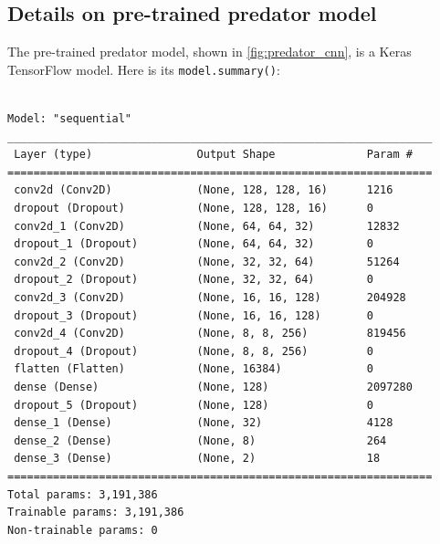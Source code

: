 \documentclass[acmtog]{acmart}
\begin{document}
\subsection{Details on pre-trained predator model}
The pre-trained predator model, shown in \ref{fig:predator_cnn}, is a Keras TensorFlow model. Here is its \texttt{model.summary()}:
\begin{adjustwidth}{1cm}{0cm}
\begin{small}
\begin{verbatim}

Model: "sequential"
_________________________________________________________________
 Layer (type)                Output Shape              Param #
=================================================================
 conv2d (Conv2D)             (None, 128, 128, 16)      1216
 dropout (Dropout)           (None, 128, 128, 16)      0
 conv2d_1 (Conv2D)           (None, 64, 64, 32)        12832
 dropout_1 (Dropout)         (None, 64, 64, 32)        0
 conv2d_2 (Conv2D)           (None, 32, 32, 64)        51264
 dropout_2 (Dropout)         (None, 32, 32, 64)        0
 conv2d_3 (Conv2D)           (None, 16, 16, 128)       204928
 dropout_3 (Dropout)         (None, 16, 16, 128)       0
 conv2d_4 (Conv2D)           (None, 8, 8, 256)         819456
 dropout_4 (Dropout)         (None, 8, 8, 256)         0
 flatten (Flatten)           (None, 16384)             0
 dense (Dense)               (None, 128)               2097280
 dropout_5 (Dropout)         (None, 128)               0
 dense_1 (Dense)             (None, 32)                4128
 dense_2 (Dense)             (None, 8)                 264
 dense_3 (Dense)             (None, 2)                 18
=================================================================
Total params: 3,191,386
Trainable params: 3,191,386
Non-trainable params: 0
\end{verbatim}
\end{small}
\end{adjustwidth}

\end{document}

